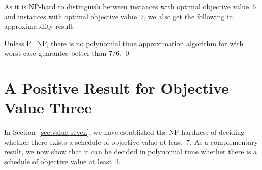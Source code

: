 As it is NP-hard to distinguish between {\xxxNTP} instances with optimal objective value~$6$ 
and {\xxxNTP} instances with optimal objective value~$7$, we also get the following 
in approximability result.
\begin{corollary}
\label{coro:inapproximability}
Unless P=NP, there is no polynomial time approximation algorithm for {\xxxNTP} with
worst case guarantee better than $7/6$.
\qed
\end{corollary}


\section{A Positive Result for Objective Value Three}
\label{sec:value-three}
In Section~\ref{sec:value-seven}, we have established the NP-hardness of deciding whether 
there exists a schedule of objective value at least~$7$. 
As a complementary result, we now show that it can be decided in polynomial time whether there is
a schedule of objective value at least~$3$.

